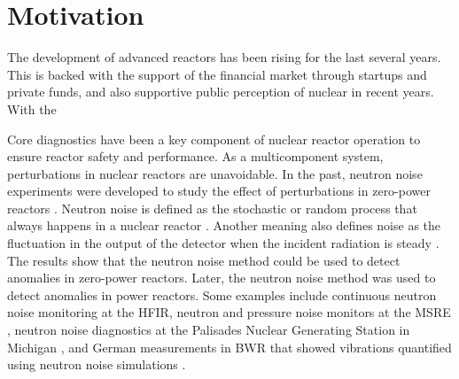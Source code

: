 \label{ch:intro}

\section{Motivation}

The development of advanced reactors has been rising for the last several years. This is backed with the support of the financial market through startups and private funds, and also supportive public perception of nuclear in recent years. With the 

Core diagnostics have been a key component of nuclear reactor operation to ensure reactor safety and performance. As a multicomponent system, perturbations in nuclear reactors are unavoidable. In the past, neutron noise experiments were developed to study the effect of perturbations in zero-power reactors \cite{akcasuApplicationLangevinTechnique1966,cohnSimplifiedTheoryPile1960,moorePowerNoiseTransfer1959}. Neutron noise is defined as the stochastic or random process that always happens in a nuclear reactor \cite{saitoTheoryPowerReactor1974b}. Another meaning also defines noise as the fluctuation in the output of the detector when the incident radiation is steady \cite{pacilioAnalysisReactorNoise1979}. The results show that the neutron noise method could be used to detect anomalies in zero-power reactors. Later, the neutron noise method was used to detect anomalies in power reactors. Some examples include continuous neutron noise monitoring at the \gls*{HFIR}, neutron and pressure noise monitors at the \gls*{MSRE} \cite{fryExperienceReactorMalfunction1971}, neutron noise diagnostics at the Palisades Nuclear Generating Station in Michigan \cite{fryAnalysisNeutrondensityOscillations1975}, and German measurements in \gls*{BWR} that showed vibrations quantified using neutron noise simulations \cite{wachInvestigationJointEffect1974}. 

